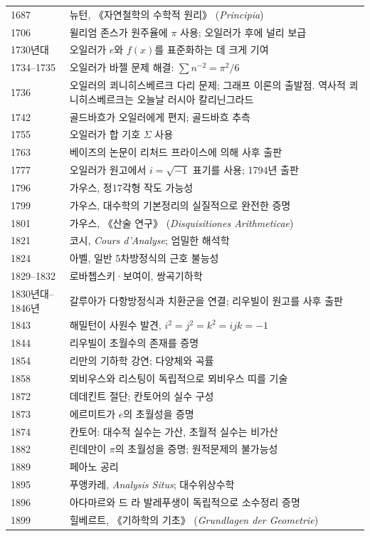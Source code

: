 \begin{center}
\begin{longtable}{@{}L{0.14\textwidth}L{0.78\textwidth}@{}}
1687 & 뉴턴, 《자연철학의 수학적 원리》 (\textit{Principia})\\
1706 & 윌리엄 존스가 원주율에 $\pi$ 사용; 오일러가 후에 널리 보급\\
1730년대 & 오일러가 $e$와 $f(x)$를 표준화하는 데 크게 기여\\
1734--1735 & 오일러가 바젤 문제 해결: $\sum n^{-2}=\pi^2/6$\\
1736 & 오일러의 쾨니히스베르크 다리 문제; 그래프 이론의 출발점. 역사적 쾨니히스베르크는 오늘날 러시아 칼리닌그라드\\
1742 & 골드바흐가 오일러에게 편지; 골드바흐 추측\\
1755 & 오일러가 합 기호 $\Sigma$ 사용\\
1763 & 베이즈의 논문이 리처드 프라이스에 의해 사후 출판\\
1777 & 오일러가 원고에서 $i=\sqrt{-1}$ 표기를 사용; 1794년 출판\\
1796 & 가우스, 정17각형 작도 가능성\\
1799 & 가우스, 대수학의 기본정리의 실질적으로 완전한 증명\\
1801 & 가우스, 《산술 연구》 (\textit{Disquisitiones Arithmeticae})\\
1821 & 코시, \textit{Cours d'Analyse}; 엄밀한 해석학\\
1824 & 아벨, 일반 5차방정식의 근호 불능성\\
1829--1832 & 로바쳅스키·보여이, 쌍곡기하학\\
1830년대--1846년 & 갈루아가 다항방정식과 치환군을 연결; 리우빌이 원고를 사후 출판\\
1843 & 해밀턴이 사원수 발견, $i^2=j^2=k^2=ijk=-1$\\
1844 & 리우빌이 초월수의 존재를 증명\\
1854 & 리만의 기하학 강연; 다양체와 곡률\\
1858 & 뫼비우스와 리스팅이 독립적으로 뫼비우스 띠를 기술\\
1872 & 데데킨트 절단; 칸토어의 실수 구성\\
1873 & 에르미트가 $e$의 초월성을 증명\\
1874 & 칸토어: 대수적 실수는 가산, 초월적 실수는 비가산\\
1882 & 린데만이 $\pi$의 초월성을 증명; 원적문제의 불가능성\\
1889 & 페아노 공리\\
1895 & 푸앵카레, \textit{Analysis Situs}; 대수위상수학\\
1896 & 아다마르와 드 라 발레푸생이 독립적으로 소수정리 증명\\
1899 & 힐베르트, 《기하학의 기초》 (\textit{Grundlagen der Geometrie})\\

\end{longtable}
\end{center}
